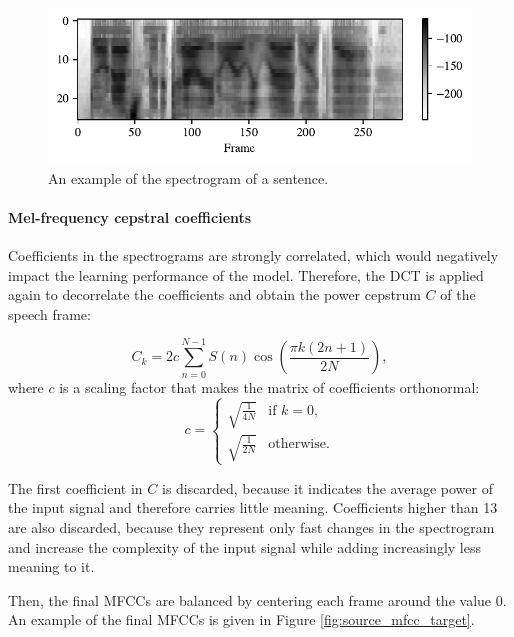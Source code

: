 			\begin{figure}[ht]
				\centering
			    \includegraphics[width=\linewidth]{gfx/spectrogram}
			    \caption[Spectrogram]{An example of the spectrogram of a sentence.}
			    \label{fig:spectrogram}
			\end{figure}

		\paragraph{Mel-frequency cepstral coefficients}

			Coefficients in the spectrograms are strongly correlated, which would negatively impact the learning performance of the model.
			Therefore, the DCT is applied again to decorrelate the coefficients and obtain the power cepstrum $C$ of the speech frame:

			\begin{equation}
				C_k = 2c\sum^{N-1}_{n=0}S\left(n\right)\cos\left(\frac{\pi k\left(2n+1\right)}{2N}\right),
			\end{equation}
			where $c$ is a scaling factor that makes the matrix of coefficients orthonormal:
			\begin{equation}
			c = \begin{cases}
				\sqrt{\frac{1}{4N}} & \mbox{if } k = 0,\\
				\sqrt{\frac{1}{2N}} & \mbox{otherwise.}
			\end{cases}
			\end{equation}

			The first coefficient in $C$ is discarded, because it indicates the average power of the input signal and therefore carries little meaning.
			Coefficients higher than 13 are also discarded, because they represent only fast changes in the spectrogram and increase the complexity of the input signal while adding increasingly less meaning to it.

			Then, the final MFCCs are balanced by centering each frame around the value 0.
			An example of the final MFCCs is given in Figure \ref{fig:source_mfcc_target}.

